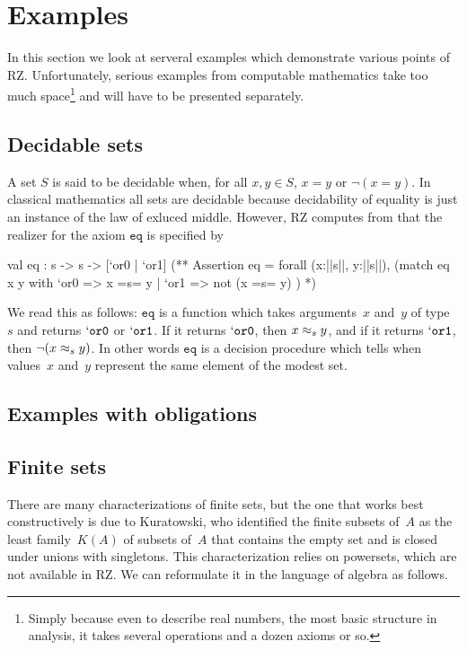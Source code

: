 \section{Examples}
\label{sec:examples}

In this section we look at serveral examples which demonstrate various
points of RZ. Unfortunately, serious examples from computable
mathematics take too much space\footnote{Simply because even to
  describe real numbers, the most basic structure in analysis, it
  takes several operations and a dozen axioms or so.} and will have to
be presented separately.

\subsection{Decidable sets}
\label{sec:decidable-sets}

A set $S$ is said to be decidable when, for all $x, y \in S$, $x = y$
or $\lnot (x = y)$. In classical mathematics all sets are decidable
because decidability of equality is just an instance of the law of
exluced middle. However, RZ computes from
%
%
that the realizer for the axiom $\mathtt{eq}$ is specified by
%
\begin{source}
val eq : s -> s -> [`or0 | `or1]
(**  Assertion eq =
       forall (x:||s||, y:||s||),
         (match eq x y with
            `or0 => x =s= y
          | `or1 => not (x =s= y)
          )
*)
\end{source}
%
We read this as follows: $\mathtt{eq}$ is a function which takes
arguments~$x$ and~$y$ of type~$s$ and returns $\mathtt{`or0}$ or
$\mathtt{`or1}$. If it returns $\mathtt{`or0}$, then $x \approx_s y$, and
if it returns $\mathtt{`or1}$, then $\lnot (x \approx_s y)$. In other
words $\mathtt{eq}$ is a decision procedure which tells when
values~$x$ and~$y$ represent the same element of the modest set.

\subsection{Examples with obligations}
\label{sec:exampl-with-oblig}


\subsection{Finite sets}
\label{sec:finite-sets}

There are many characterizations of finite sets, but the one that
works best constructively is due to Kuratowski, who identified the
finite subsets of~$A$ as the least family~$K(A)$ of subsets of~$A$
that contains the empty set and is closed under unions with
singletons. This characterization relies on powersets, which are not
available in RZ. We can reformulate it in the language of algebra as
follows.

